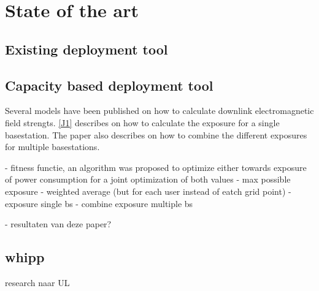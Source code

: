 \chapter{State of the art}
\label{chap:stateoftheart}

\section{Existing deployment tool}

\section{Capacity based deployment tool}
Several models have been published on how to calculate downlink electromagnetic field strengts. \ref{J1} describes on how to calculate the exposure for a single basestation.
The paper also describes on how to combine the different exposures for multiple basestations. 


- fitness functie, an algorithm was proposed to optimize either towards exposure of power consumption for a joint optimization of both values
- max possible exposure
- weighted average (but for each user instead of eatch grid point)
- exposure single bs
- combine exposure multiple bs

- resultaten van deze paper?


\section{whipp}
research naar UL